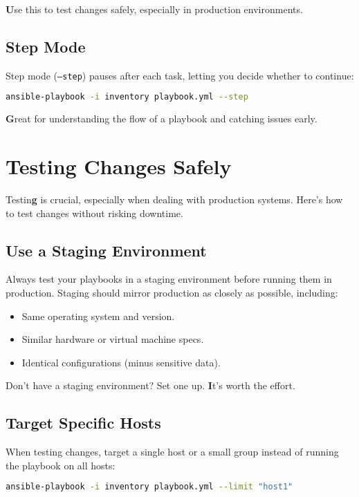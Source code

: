 \textbf{U}se this to test changes safely, especially in production environments.

\subsection{Step Mode}

Step mode (\texttt{--step}) pauses after each task, letting you decide whether to continue:
\begin{lstlisting}[language=bash, caption=Running a Playbook in Step Mode]
ansible-playbook -i inventory playbook.yml --step
\end{lstlisting}

\textbf{G}reat for understanding the flow of a playbook and catching issues early.


\section{Testing Changes Safely}

Testin\textbf{g} is crucial, especially when dealing with production systems. Here's how to test changes without risking downtime.

\subsection{Use a Staging Environment}

Always test your playbooks in a staging environment before running them in production. Staging should mirror production as closely as possible, including:
\begin{itemize}
    \item Same operating system and version.
    \item Similar hardware or virtual machine specs.
    \item Identical configurations (minus sensitive data).
\end{itemize}

Don't have a staging environment? Set one up. \textbf{I}t's worth the effort.

\subsection{Target Specific Hosts}

When testing changes, target a single host or a small group instead of running the playbook on all hosts:
\begin{lstlisting}[language=bash, caption=Running on a Single Host]
ansible-playbook -i inventory playbook.yml --limit "host1"
\end{lstlisting}

